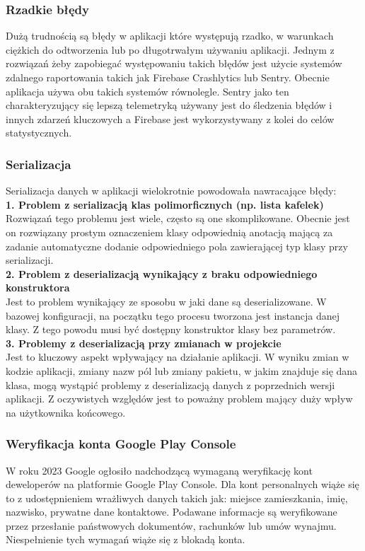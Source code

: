 \newpage

\subsubsection{Rzadkie błędy}
Dużą trudnością są błędy w aplikacji które występują rzadko, w warunkach ciężkich do odtworzenia lub po długotrwałym używaniu aplikacji. Jednym z rozwiązań żeby zapobiegać występowaniu takich błędów jest użycie systemów zdalnego raportowania takich jak Firebase Crashlytics lub Sentry. Obecnie aplikacja używa obu takich systemów równolegle. Sentry jako ten charakteryzujący się lepszą telemetryką używany jest do śledzenia błędów i innych zdarzeń kluczowych a Firebase jest wykorzystywany z kolei do celów statystycznych.

\subsubsection{Serializacja}
Serializacja danych w aplikacji wielokrotnie powodowała nawracające błędy:\\

\textbf{1. Problem z serializacją klas polimorficznych (np. lista kafelek)}\\
Rozwiązań tego problemu jest wiele, często są one skomplikowane. Obecnie jest on rozwiązany prostym oznaczeniem klasy  odpowiednią anotacją mającą za zadanie automatyczne dodanie odpowiedniego pola zawierającej typ klasy przy serializacji.\\

\textbf{2. Problem z deserializacją wynikający z braku odpowiedniego konstruktora}\\
Jest to problem wynikający ze sposobu w jaki dane są deserializowane. W bazowej konfiguracji, na początku tego procesu tworzona jest instancja danej klasy. Z tego powodu musi być dostępny konstruktor klasy bez parametrów.\\

\textbf{3. Problemy z deserializacją przy zmianach w projekcie}\\
Jest to kluczowy aspekt wpływający na działanie aplikacji. W wyniku zmian w kodzie aplikacji, zmiany nazw pól lub zmiany pakietu, w jakim znajduje się dana klasa, mogą wystąpić problemy z deserializacją danych z poprzednich wersji aplikacji. Z oczywistych względów jest to poważny problem mający duży wpływ na użytkownika końcowego.

\subsubsection{Weryfikacja konta Google Play Console}
W roku 2023 Google ogłosiło nadchodzącą wymaganą weryfikację kont deweloperów na platformie Google Play Console. Dla kont personalnych wiąże się to z udostępnieniem wrażliwych danych takich jak: miejsce zamieszkania, imię, nazwisko, prywatne dane kontaktowe. Podawane informacje są weryfikowane przez przesłanie państwowych dokumentów, rachunków lub umów wynajmu. Niespełnienie tych wymagań wiąże się z blokadą konta.

